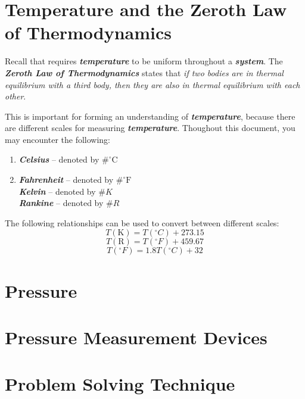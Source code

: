 \section{Temperature and the Zeroth Law of Thermodynamics}
Recall that  requires \textbf{\textit{temperature}} to be uniform throughout a \textbf{\textit{system}}. The \textbf{\textit{Zeroth Law of Thermodynamics}} states that \textit{if two bodies are in thermal equilibrium with a third body, then they are also in thermal equilibrium with each other}.

This is important for forming an understanding of \textbf{\textit{temperature}}, because there are different scales for measuring \textbf{\textit{temperature}}. Thoughout this document, you may encounter the following:
%
\begin{enumerate}
\item \textbf{\textit{Celsius}} -- denoted by $\#^\circ \text{C}$\\
\item \textbf{\textit{Fahrenheit}} -- denoted by $\#^\circ \text{F}$\\
\textbf{\textit{Kelvin}} -- denoted by $\#K$\\
\textbf{\textit{Rankine}} -- denoted by $\#R$\\
\end{enumerate}
%
The following relationships can be used to convert between different scales:
%
\begin{equation}
T(\text{K}) = T(^\circ C) + 273.15
\end{equation}
%
%
\begin{equation}
T(\text{R}) = T(^\circ F) + 459.67
\end{equation}
%
%
\begin{equation}
T(^\circ F) = 1.8T(^\circ C) + 32
\end{equation}
%

\section{Pressure}

\section{Pressure Measurement Devices}

\section{Problem Solving Technique}

